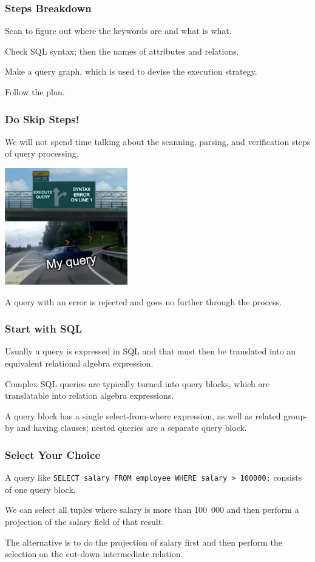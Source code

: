 \begin{frame}
\frametitle{Steps Breakdown}
Scan to figure out where the keywords are and what is what.

Check SQL syntax; then the names of attributes and relations.

Make a query graph, which is used to devise the execution strategy. 

Follow the plan.

\end{frame}



\begin{frame}
\frametitle{Do Skip Steps!}

We will not spend time talking about the scanning, parsing, and verification steps of query processing.

\begin{center}
\includegraphics[width=0.4\textwidth]{images/syntaxerror.jpg}
\end{center}

A query with an error is rejected and goes no further through the process. 

\end{frame}

\begin{frame}
\frametitle{Start with SQL}
Usually a query is expressed in SQL and that must then be translated into an equivalent \alert{relational algebra} expression. 

Complex SQL queries are typically turned into \alert{query blocks}, which are translatable into relation algebra expressions. 

A query block has a single select-from-where expression, as well as related group-by and having clauses; nested queries are a separate query block.

\end{frame}

\begin{frame}
\frametitle{Select Your Choice}
A query like \texttt{SELECT salary FROM employee WHERE salary > 100000;} consists of one query block. 

We can select all tuples where salary is more than 100~000 and then perform a projection of the salary field of that result. 

The alternative is to do the projection of salary first and then perform the selection on the cut-down intermediate relation.

\end{frame}


